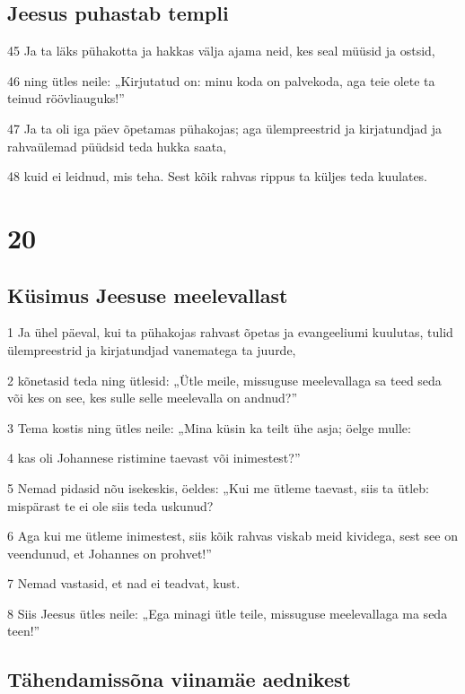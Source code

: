 \section*{Jeesus puhastab templi}

\par 45 Ja ta läks pühakotta ja hakkas välja ajama neid, kes seal müüsid ja ostsid,
\par 46 ning ütles neile: „Kirjutatud on: minu koda on palvekoda, aga teie olete ta teinud röövliauguks!”
\par 47 Ja ta oli iga päev õpetamas pühakojas; aga ülempreestrid ja kirjatundjad ja rahvaülemad püüdsid teda hukka saata,
\par 48 kuid ei leidnud, mis teha. Sest kõik rahvas rippus ta küljes teda kuulates.


\chapter{20}

\section*{Küsimus Jeesuse meelevallast}

\par 1 Ja ühel päeval, kui ta pühakojas rahvast õpetas ja evangeeliumi kuulutas, tulid ülempreestrid ja kirjatundjad vanematega ta juurde,
\par 2 kõnetasid teda ning ütlesid: „Ütle meile, missuguse meelevallaga sa teed seda või kes on see, kes sulle selle meelevalla on andnud?”
\par 3 Tema kostis ning ütles neile: „Mina küsin ka teilt ühe asja; öelge mulle:
\par 4 kas oli Johannese ristimine taevast või inimestest?”
\par 5 Nemad pidasid nõu isekeskis, öeldes: „Kui me ütleme taevast, siis ta ütleb: mispärast te ei ole siis teda uskunud?
\par 6 Aga kui me ütleme inimestest, siis kõik rahvas viskab meid kividega, sest see on veendunud, et Johannes on prohvet!”
\par 7 Nemad vastasid, et nad ei teadvat, kust.
\par 8 Siis Jeesus ütles neile: „Ega minagi ütle teile, missuguse meelevallaga ma seda teen!”

\section*{Tähendamissõna viinamäe aednikest}

